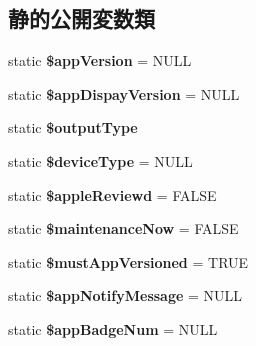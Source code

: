 \subsection*{静的公開変数類}
\begin{DoxyCompactItemize}
\item 
\hypertarget{class_m_v_c_core_a59f8bd5d7e677495ba29e8e1db414682}{}static {\bfseries \$app\+Version} = N\+U\+L\+L\label{class_m_v_c_core_a59f8bd5d7e677495ba29e8e1db414682}

\item 
\hypertarget{class_m_v_c_core_a7549d98f3cf017dfae660e5212974a6e}{}static {\bfseries \$app\+Dispay\+Version} = N\+U\+L\+L\label{class_m_v_c_core_a7549d98f3cf017dfae660e5212974a6e}

\item 
\hypertarget{class_m_v_c_core_a3eac1d3066e12fb22ce2fdcb4f23a0ff}{}static {\bfseries \$output\+Type}\label{class_m_v_c_core_a3eac1d3066e12fb22ce2fdcb4f23a0ff}

\item 
\hypertarget{class_m_v_c_core_a197ea3b4d1c4a005880f754973f76f7a}{}static {\bfseries \$device\+Type} = N\+U\+L\+L\label{class_m_v_c_core_a197ea3b4d1c4a005880f754973f76f7a}

\item 
\hypertarget{class_m_v_c_core_a89e66b13e31a7c9a7f7b2ea81c59e7bd}{}static {\bfseries \$apple\+Reviewd} = F\+A\+L\+S\+E\label{class_m_v_c_core_a89e66b13e31a7c9a7f7b2ea81c59e7bd}

\item 
\hypertarget{class_m_v_c_core_ad69beb818592379e31e86d000c713abe}{}static {\bfseries \$maintenance\+Now} = F\+A\+L\+S\+E\label{class_m_v_c_core_ad69beb818592379e31e86d000c713abe}

\item 
\hypertarget{class_m_v_c_core_ae482ab8d268695c4ebf1defb3a087ce9}{}static {\bfseries \$must\+App\+Versioned} = T\+R\+U\+E\label{class_m_v_c_core_ae482ab8d268695c4ebf1defb3a087ce9}

\item 
\hypertarget{class_m_v_c_core_aad8457f78edb617bf68e9cdc28fae35b}{}static {\bfseries \$app\+Notify\+Message} = N\+U\+L\+L\label{class_m_v_c_core_aad8457f78edb617bf68e9cdc28fae35b}

\item 
\hypertarget{class_m_v_c_core_a93b6194dfdc333d569dfe91f9c04844c}{}static {\bfseries \$app\+Badge\+Num} = N\+U\+L\+L\label{class_m_v_c_core_a93b6194dfdc333d569dfe91f9c04844c}


\end{DoxyCompactItemize}
